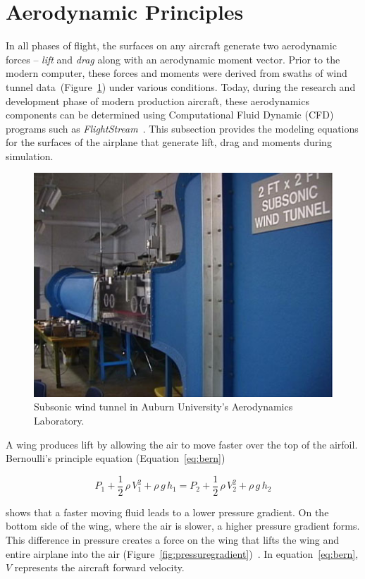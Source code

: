 \section{\textbf{Aerodynamic Principles}}\label{section:aerodynamic}
In all phases of flight, the surfaces on any aircraft generate two aerodynamic forces {--} \textit{lift} and \textit{drag} along with an aerodynamic moment vector. Prior to the modern computer, these forces and moments were derived from swaths of wind tunnel data~(Figure~\ref{fig:windtunnel}) under various conditions. Today, during the research and development phase of modern production aircraft, these aerodynamics components can be determined using Computational Fluid Dynamic (CFD) programs such as \textit{FlightStream}~\cite{FlightStream2022}. This subsection provides the modeling equations for the surfaces of the airplane that generate lift, drag and moments during simulation.

\begin{figure}[!ht]
    \centering
    \includegraphics[width=.75\linewidth]{Figures/opencircuitwindtunnel.jpg}
    \caption{Subsonic wind tunnel in Auburn University's Aerodynamics Laboratory.}\label{fig:windtunnel}
\end{figure}


A wing produces lift by allowing the air to move faster over the top of the airfoil. Bernoulli's principle equation (Equation~\ref{eq:bern})

\begin{equation}\label{eq:bern}
    P_1 + \frac{1}{2}\, \rho \, V_1^2 + \rho \, g \, h_1 = P_2 + \frac{1}{2}\, \rho \, V_2^2 + \rho \, g \, h_2
\end{equation}

shows that a faster moving fluid leads to a lower pressure gradient. On the bottom side of the wing, where the air is slower, a higher pressure gradient forms. This difference in pressure creates a force on the wing that lifts the wing and entire airplane into the air (Figure~\ref{fig:pressuregradient})~\cite{WhatLift}. In equation~\ref{eq:bern}, \(V\) represents the aircraft forward velocity.

